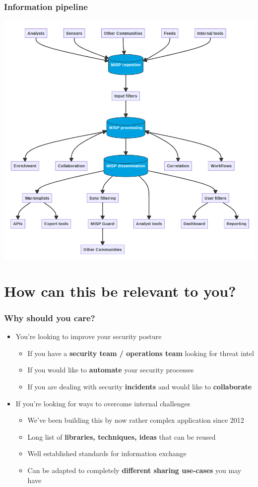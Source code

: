 \begin{frame}
    \frametitle{Information pipeline}
    \begin{center}
        \includegraphics[width=0.75\linewidth]{misp_data_flow.png}
    \end{center}
\end{frame}


\section{How can this be relevant to you?}

\begin{frame}
\frametitle{Why should you care?}
    \begin{itemize}
        \item You're looking to improve your security posture
        \begin{itemize}
            \item If you have a {\bf security team / operations team} looking for threat intel
            \item If you would like to {\bf automate} your security processes
            \item If you are dealing with security {\bf incidents} and would like to {\bf collaborate}
        \end{itemize}
        \item If you're looking for ways to overcome internal challenges
        \begin{itemize}
            \item We've been building this by now rather complex application since 2012
            \item Long list of {\bf libraries, techniques, ideas} that can be reused
            \item Well established standards for information exchange
            \item Can be adapted to completely {\bf different sharing use-cases} you may have
        \end{itemize}
    \end{itemize}
\end{frame}

